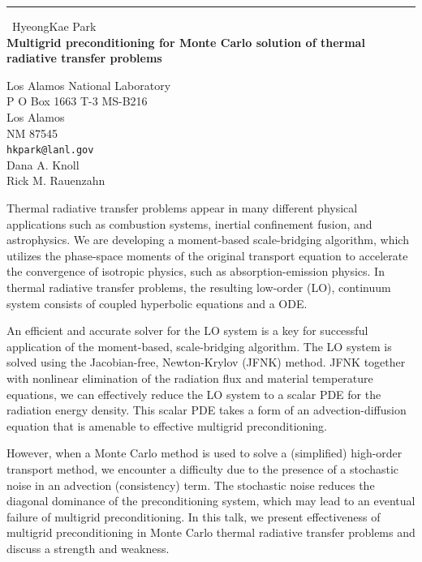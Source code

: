 \documentclass{report}
\begin{document}
\begin{center}
\rule{6in}{1pt} \
{\large HyeongKae Park \\
{\bf Multigrid preconditioning for Monte Carlo solution of thermal radiative transfer problems}}

Los Alamos National Laboratory \\ P O Box 1663 T-3 MS-B216 \\ Los Alamos \\ NM 87545
\\
{\tt hkpark@lanl.gov}\\
Dana A. Knoll\\
Rick M. Rauenzahn\end{center}

Thermal radiative transfer problems appear in many different physical
applications such as combustion systems, inertial confinement fusion, and
astrophysics. We are developing a moment-based scale-bridging algorithm,
which utilizes the phase-space moments of the original transport equation
to accelerate the convergence of isotropic physics, such as
absorption-emission physics. In thermal radiative transfer problems, the
resulting low-order (LO), continuum system consists of coupled hyperbolic
equations and a ODE.

An efficient and accurate solver for the LO system is a key for
successful application of the moment-based, scale-bridging algorithm. The
LO system is solved using the Jacobian-free, Newton-Krylov (JFNK) method.
JFNK together with nonlinear elimination of the radiation flux and
material temperature equations, we can effectively reduce the LO system
to a scalar PDE for the radiation energy density. This scalar PDE takes a
form of an advection-diffusion equation that is amenable to effective
multigrid preconditioning.

However, when a Monte Carlo method is used to solve a (simplified)
high-order transport method, we encounter a difficulty due to the
presence of a stochastic noise in an advection (consistency) term. The
stochastic noise reduces the diagonal dominance of the preconditioning
system, which may lead to an eventual failure of multigrid
preconditioning. In this talk, we present effectiveness of multigrid
preconditioning in Monte Carlo thermal radiative transfer problems and
discuss a strength and weakness.
\end{document}
